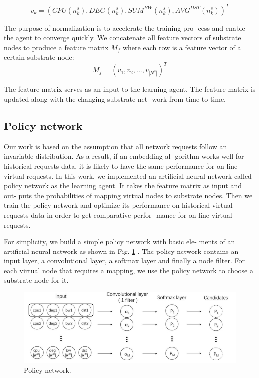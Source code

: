 \documentclass[12pt]{article}
\begin{document}
\begin{equation}
v_k = (CPU(n_k^s), DEG(n_k^s), SUM^{BW}(n_k^s), AVG^{DST}(n_k^s))^T
\end{equation}

The purpose of normalization is to accelerate the training pro-
cess and enable the agent to converge quickly. We concatenate all
feature vectors of substrate nodes to produce a feature matrix $M_f$
where each row is a feature vector of a certain substrate node:
\begin{equation}
M_f = (v_1, v_2, ..., v_{|N^s|})^T
\end{equation}

The feature matrix serves as an input to the learning agent. The
feature matrix is updated along with the changing substrate net-
work from time to time.

\subsection{Policy network}
Our work is based on the assumption that all network requests
follow an invariable distribution. As a result, if an embedding al-
gorithm works well for historical requests data, it is likely to have
the same performance for on-line virtual requests. In this work, we
implemented an artificial neural network called policy network as
the learning agent. It takes the feature matrix as input and out-
puts the probabilities of mapping virtual nodes to substrate nodes.
Then we train the policy network and optimize its performance on
historical virtual requests data in order to get comparative perfor-
mance for on-line virtual requests.

For simplicity, we build a simple policy network with basic ele-
ments of an artificial neural network as shown in Fig. \ref{fig:2} . The policy
network contains an input layer, a convolutional layer, a softmax
layer and finally a node filter. For each virtual node that requires
a mapping, we use the policy network to choose a substrate node
for it.
\begin{figure}[t!] \label{fig:2}
	\includegraphics[width=\linewidth]{fig2}
	\caption{Policy network.}
\end{figure}
\end{document}
